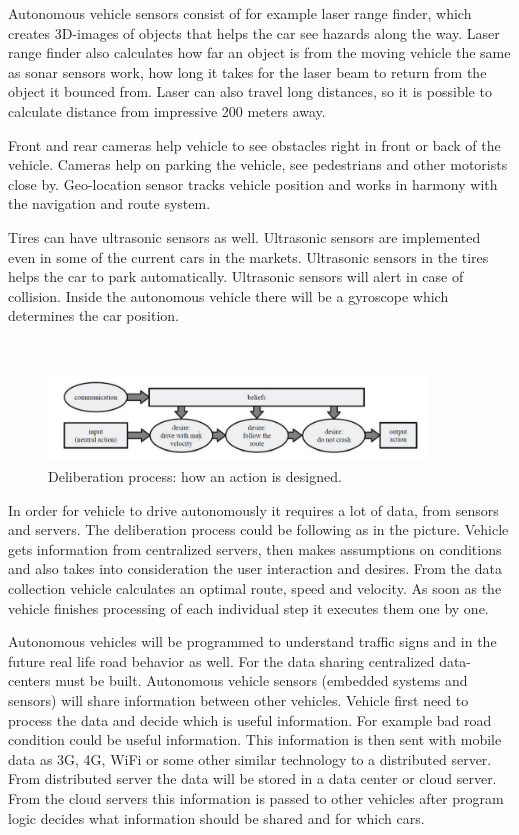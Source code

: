 \documentclass[english]{tktltiki}
\begin{document}
Autonomous vehicle sensors consist of for example laser range finder, which creates 3D-images 
of objects that helps the car see hazards along the way. Laser range finder also calculates 
how far an object is from the moving vehicle the same as sonar sensors work, how long it takes 
for the laser beam to return from the object it bounced from. Laser can also travel long distances, 
so it is possible to calculate distance from impressive 200 meters away.

Front and rear cameras help vehicle to see obstacles right in front or back of the vehicle. Cameras help on parking the vehicle, see pedestrians and other motorists close by. Geo-location sensor tracks vehicle position and works in harmony with the navigation and route system. 

Tires can have ultrasonic sensors as well. Ultrasonic sensors are implemented even in some of the current cars in the markets. Ultrasonic sensors in the tires helps the car to park automatically. Ultrasonic sensors will alert in case of collision. Inside the autonomous vehicle there will be a gyroscope which determines the car position. 

\begin{figure}[h]
\ \newline
\begin{center}
\includegraphics[width=0.9\textwidth]{process.png}
\caption{Deliberation process: how an action is designed. 
\cite{trafficmodels}}
\label{vehicle automation flow}
\end{center}
\end{figure}

In order for vehicle to drive autonomously it requires a lot of data, from sensors and servers. The deliberation process could be following as in the picture. Vehicle gets information from centralized servers, then makes assumptions on conditions and also takes into consideration the user interaction and desires. From the data collection vehicle calculates an optimal route, speed and velocity. As soon as the vehicle finishes processing of each individual step it executes them one by one.  

Autonomous vehicles will be programmed to understand traffic signs and in the future real life road behavior as well. For the data sharing centralized data-centers must be built. Autonomous vehicle sensors (embedded systems and sensors) will share information between other vehicles. Vehicle first need to process the data and decide which is useful information. For example bad road condition could be useful information. This information is then sent with mobile data as 3G, 4G, WiFi or some other similar technology to a distributed server. From distributed server the data will be stored in a data center or cloud server. From the cloud servers this information is passed to other vehicles after program logic decides what information should be shared and for which cars.  
\end{document}
